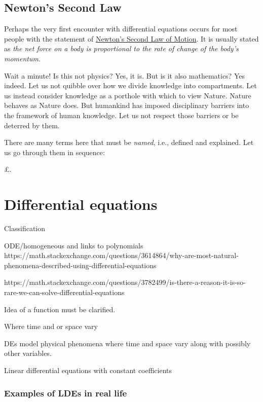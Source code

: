 \documentclass[
  a4paper,
]{article}
\begin{document}
\subsection{Newton's Second Law}\label{newtons-second-law}

Perhaps the very first encounter with differential equations occurs for
most people with the statement of
\href{https://www.britannica.com/science/Newtons-laws-of-motion/Newtons-second-law-F-ma}{Newton's
Second Law of Motion}. It is usually stated as \emph{the net force on a
body is proportional to the rate of change of the body's momentum}.

Wait a minute! Is this not physics? Yes, it is. But is it also
mathematics? Yes indeed. Let us not quibble over how we divide knowledge
into compartments. Let us instead consider knowledge as a porthole with
which to view Nature. Nature behaves as Nature does. But humankind has
imposed disciplinary barriers into the framework of human knowledge. Let
us not respect those barriers or be deterred by them.

There are many terms here that must be \emph{named}, i.e., defined and
explained. Let us go through them in sequence:

£.

\section{Differential equations}\label{differential-equations}

Classification

ODE/homogeneous and links to polynomials
https://math.stackexchange.com/questions/3614864/why-are-most-natural-phenomena-described-using-differential-equations

https://math.stackexchange.com/questions/3782499/is-there-a-reason-it-is-so-rare-we-can-solve-differential-equations

Idea of a function must be clarified.

Where time and or space vary

DEs model physical phenomena where time and space vary along with
possibly other variables.

Linear differential equations with constant coefficients

\subsubsection{Examples of LDEs in real
life}\label{examples-of-ldes-in-real-life}
\end{document}
